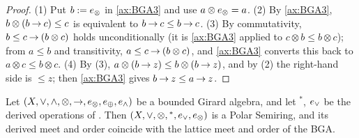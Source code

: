 \begin{proof}
(1) Put $b := e_{\otimes}$ in \eqref{ax:BGA3} and use $a \otimes e_{\otimes} = a$.
(2) By \eqref{ax:BGA3}, $b \otimes (b \mathbin{\to} c) \leq c$ is equivalent to
$b \mathbin{\to} c \leq b \mathbin{\to} c$.
(3) By commutativity, $b \leq c \mathbin{\to} (b \otimes c)$ holds unconditionally
(it is \eqref{ax:BGA3} applied to $c \otimes b \leq b \otimes c$); from
$a \leq b$ and transitivity, $a \leq c \mathbin{\to} (b \otimes c)$, and
\eqref{ax:BGA3} converts this back to $a \otimes c \leq b \otimes c$.
(4) By (3), $a \otimes (b \mathbin{\to} z) \leq b \otimes (b \mathbin{\to} z)$, and by (2)
the right-hand side is $\leq z$; then \eqref{ax:BGA3} gives
$b \mathbin{\to} z \leq a \mathbin{\to} z$.
\end{proof}

\begin{theorem}\label{thm:bga-implies-ps}
Let $(X,\vee,\wedge,\otimes,\mathbin{\to},e_{\otimes},e_{\oplus},e_{\wedge})$ be a bounded Girard algebra,
and let ${}^{*}$, $e_{\vee}$ be the derived operations of . Then
$(X,\vee,\otimes,{}^{*},e_{\vee},e_{\otimes})$ is a Polar Semiring, and its derived meet
and order coincide with the lattice meet and order of the BGA.
\end{theorem}

